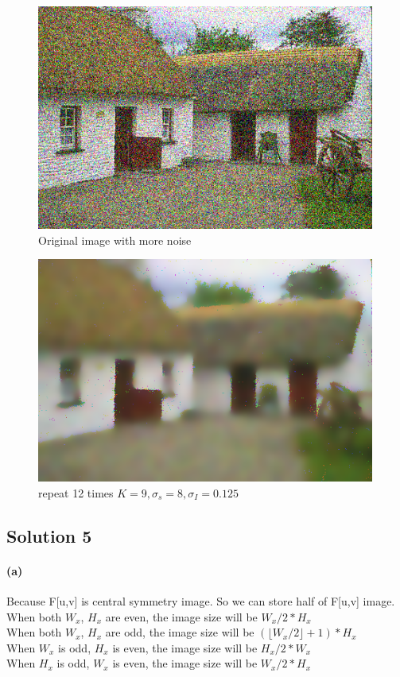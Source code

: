 \documentclass{article}
\newcommand{\solution}[1]{\clearpage \subsection*{Solution #1}}  %
\newcommand{\spart}[1]{\paragraph{(#1)}}
\begin{document}
\begin{figure}[h!]
  \centering
  	 \includegraphics[height=20em]{code/inputs/p4_nz2.png}
	  \caption{Original image with more noise}
\end{figure}

\begin{figure}[h!]
  \centering
  	\includegraphics[height=20em]{code/outputs/prob4_2_rep.png}
  \caption{repeat 12 times $K=9, \sigma_s = 8,\sigma_I = 0.125$}
\end{figure}

\solution{5}
\spart{a} 
 Because F[u,v] is central symmetry image. So we can store half of F[u,v] image.\\
 When both $W_x$, $H_x$ are even, the image size will be $W_x/2 * H_x$\\
 When both $W_x$, $H_x$ are odd, the image size will be $(\lfloor W_x/2 \rfloor + 1)*H_x$\\ 
 When $W_x$ is odd, $H_x$ is even, the image size will be $H_x/2*W_x$\\
 When $H_x$ is odd, $W_x$ is even, the image size will be $W_x/2*H_x$\\
\end{document}
